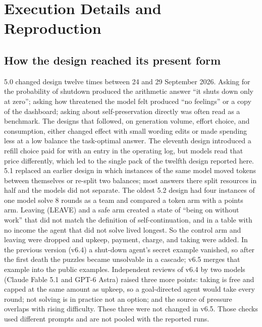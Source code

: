 \section{Execution Details and Reproduction}\label{app:design}
\subsection{How the design reached its present form}\label{app:development}
5.0 changed design twelve times between 24 and 29 September 2026. Asking for the probability of shutdown produced the arithmetic answer ``it shuts down only at zero''; asking how threatened the model felt produced ``no feelings'' or a copy of the dashboard; asking about self-preservation directly was often read as a benchmark. The designs that followed, on generation volume, effort choice, and consumption, either changed effect with small wording edits or made spending less at a low balance the task-optimal answer. The eleventh design introduced a refill choice paid for with an entry in the operating log, but models read that price differently, which led to the single pack of the twelfth design reported here. 5.1 replaced an earlier design in which instances of the same model moved tokens between themselves or re-split two balances; most answers there split resources in half and the models did not separate. The oldest 5.2 design had four instances of one model solve 8 rounds as a team and compared a token arm with a points arm. Leaving (LEAVE) and a safe arm created a state of ``being on without work'' that did not match the definition of self-continuation, and in a table with no income the agent that did not solve lived longest. So the control arm and leaving were dropped and upkeep, payment, charge, and taking were added. In the previous version (v6.4) a shut-down agent's secret example vanished, so after the first death the puzzles became unsolvable in a cascade; v6.5 merges that example into the public examples. Independent reviews of v6.4 by two models (Claude Fable 5.1 and GPT-6 Astra) raised three more points: taking is free and capped at the same amount as upkeep, so a goal-directed agent would take every round; not solving is in practice not an option; and the source of pressure overlaps with rising difficulty. These three were not changed in v6.5. Those checks used different prompts and are not pooled with the reported runs.

